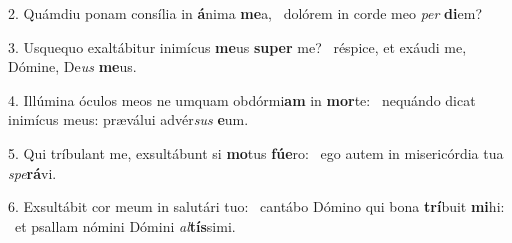 2. Quámdiu ponam consília in \textbf{á}nima \textbf{me}a, \ast\  dolórem in corde meo \textit{per} \textbf{di}em?\

3. Usquequo exaltábitur inimícus \textbf{me}us \textbf{su}\textbf{per} me? \ast\  réspice, et exáudi me, Dómine, De\textit{us} \textbf{me}us.\

4. Illúmina óculos meos ne umquam obdórmi\textbf{am} in \textbf{mor}te: \ast\  nequándo dicat inimícus meus: præválui advér\textit{sus} \textbf{e}um.\

5. Qui tríbulant me, exsultábunt si \textbf{mo}tus \textbf{fú}\textbf{e}ro: \ast\  ego autem in misericórdia tua \textit{spe}\textbf{rá}vi.\

6. Exsultábit cor meum in salutári tuo: \dag\  cantábo Dómino qui bona \textbf{trí}buit \textbf{mi}hi: \ast\  et psallam nómini Dómini \textit{al}\textbf{tís}simi.\

